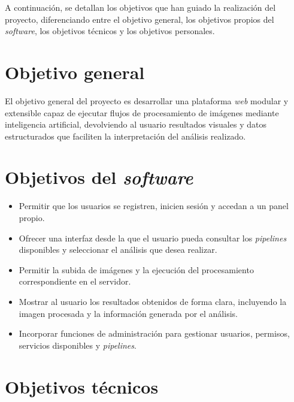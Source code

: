 
A continuación, se detallan los objetivos que han guiado la realización del proyecto, diferenciando entre el objetivo general, los objetivos propios del \textit{software}, los objetivos técnicos y los objetivos personales.

\section{Objetivo general}

El objetivo general del proyecto es desarrollar una plataforma \textit{web} modular y extensible capaz de ejecutar flujos de procesamiento de imágenes mediante inteligencia artificial, devolviendo al usuario resultados visuales y datos estructurados que faciliten la interpretación del análisis realizado.

\section{Objetivos del \textit{software}}

\begin{itemize}
	\item Permitir que los usuarios se registren, inicien sesión y accedan a un panel propio.
	\item Ofrecer una interfaz desde la que el usuario pueda consultar los \textit{pipelines} disponibles y seleccionar el análisis que desea realizar.
	\item Permitir la subida de imágenes y la ejecución del procesamiento correspondiente en el servidor.
	\item Mostrar al usuario los resultados obtenidos de forma clara, incluyendo la imagen procesada y la información generada por el análisis.
	\item Incorporar funciones de administración para gestionar usuarios, permisos, servicios disponibles y \textit{pipelines}.
\end{itemize}

\section{Objetivos técnicos}

